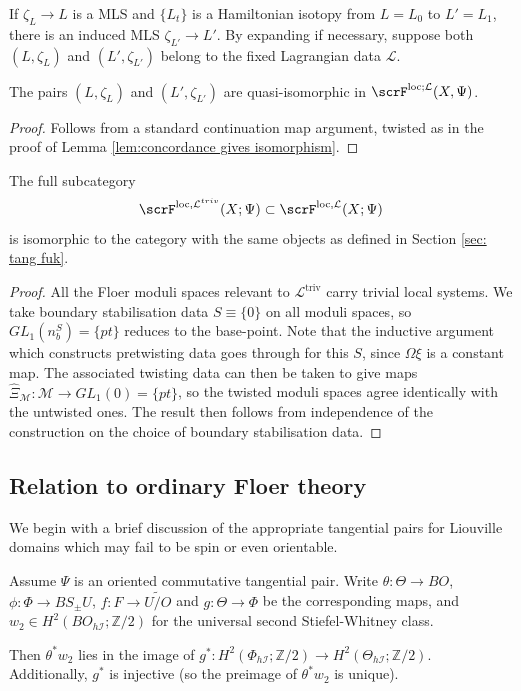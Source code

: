 \documentclass{TPmod}
\newcommand{\triv}{\mathrm{triv}}
\DeclareMathOperator{\loc}{loc}
\def\bZ{\mathbb{Z}}
\newcommand{\cI}{\mathcal{I}}
\newcommand{\cL}{\mathcal{L}}
\newcommand{\cM}{\mathcal{M}}
\def\bZ{\mathbb{Z}}
\numberwithin{equation}{section}
\begin{document}
If $\zeta_L \to L$ is a MLS and $\{L_t\}$ is a Hamiltonian isotopy from $L = L_0$ to $L' = L_1$, there is an induced MLS $\zeta_{L'} \to L'$. By expanding if necessary, suppose both $(L,\zeta_L)$ and $(L',\zeta_{L'})$ belong to the fixed Lagrangian data $\cL$. 

\begin{lem}
    The pairs $(L,\zeta_L)$ and $(L',\zeta_{L'})$ are quasi-isomorphic in $\scrF^{\loc;\cL}(X,\Psi)$.
\end{lem}

\begin{proof}
    Follows from a standard continuation map argument, twisted as in the proof of Lemma \ref{lem:concordance gives isomorphism}.
\end{proof}


    \begin{prop}
        The full subcategory
        \[
        \scrF^{\loc,\cL^{triv}}(X;\Psi) \subset \scrF^{\loc,\cL}(X;\Psi)
        \]
        is isomorphic to the category with the same objects as defined in Section \ref{sec: tang fuk}.
    \end{prop}
    \begin{proof}
        All the Floer moduli spaces relevant to $\cL^{\triv}$ carry trivial local systems. We take boundary stabilisation data $S \equiv \{0\}$ on all moduli spaces, so $GL_1(n_b^S) = \{pt\}$ reduces to the base-point. Note that the inductive argument which constructs pretwisting data goes through for this $S$, since $\Omega\xi$ is a constant map. The associated twisting data can then be taken to give maps $\hat\Xi_\cM: \cM \to GL_1(0) = \{pt\}$, so the twisted moduli spaces agree identically with the untwisted ones. The result then follows from independence of the construction on the choice of boundary stabilisation data.
    \end{proof}

\subsection{Relation to ordinary Floer theory}\label{sec: rel ord floer}


We begin with a brief discussion of the appropriate tangential pairs for Liouville domains which may fail to be spin or even orientable. 


\begin{lem}\label{lemon 3.8}
    Assume $\Psi$ is an oriented commutative tangential pair. Write $\theta: \Theta \to BO$, $\phi: \Phi \to BS_\pm U$, $f: F \to \widetilde{U/O}$ and $g: \Theta \to \Phi$ be the corresponding maps, and $w_2 \in H^2(BO_{h\cI}; \bZ/2)$ for the universal second Stiefel-Whitney class.

    Then $\theta^*w_2$ lies in the image of $g^*:  H^2(\Phi_{h\cI}; \bZ/2) \to  H^2(\Theta_{h\cI}; \bZ/2)$. Additionally, $g^*$ is injective (so the preimage of $\theta^* w_2$ is unique).
\end{lem}
\end{document}
